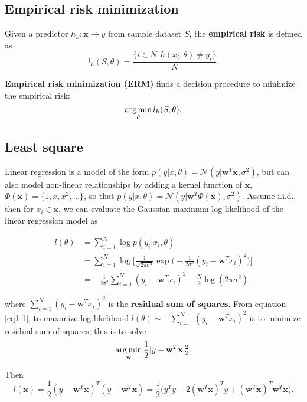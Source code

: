 \documentclass[../main.tex]{subfiles}
\begin{document}
\setlength{\parindent}{0pt}
\subsection{Empirical risk minimization}
Given a predictor $h_S:\textbf{x}\to y$ from sample dataset $S$, the \textbf{empirical risk} is defined as $$l_h(S, \theta)=\frac{\{i\in N: h(x_i, \theta)\neq y_i\}}{N}.$$

\textbf{Empirical risk minimization (ERM)} finds a decision procedure to minimize the empirical risk: $$\operatorname*{arg\,min}_{\theta}l_h(S, \theta).$$

\subsection{Least square}
Linear regression is a model of the form $p(y|x, \theta)=\mathcal N(y|\textbf{w}^T\textbf{x}, \sigma^2)$, but can also model non-linear relationships by adding a kernel function of $\textbf{x}$, $\Phi (\textbf{x})=\{1, x, x^2, ...\}$, so that $p(y|x, \theta)=\mathcal N(y|\textbf{w}^T\Phi (\textbf{x}), \sigma^2)$. Assume i.i.d., then for $x_i\in \textbf{x}$, we can evaluate the Gaussian maximum log likelihood of the linear regression model as

\begin{equation} \label{eq1-1}
\begin{split}
l(\theta) & = \sum_{i=1}^{N}\log p(y_i|x_i, \theta) \\
 & = \sum_{i=1}^N\log \bigg[ \frac{1}{\sqrt{2\pi\sigma^2}}\exp \big( -\frac{1}{2\sigma^2}(y_i-\textbf{w}^Tx_i)^2\big)\bigg] \\
 & = -\frac{1}{2\sigma^2}\sum_{i=1}^N(y_i-\textbf{w}^Tx_i)^2-\frac{N}{2}\log(2\pi\sigma^2),
\end{split}
\end{equation}

where $\sum_{i=1}^N(y_i-\textbf{w}^Tx_i)^2$ is the \textbf{residual sum of squares}.
From equation \ref{eq1-1}, to maximize log likelihood $l(\theta)\sim-\sum_{i=1}^N(y_i-\textbf{w}^Tx_i)^2$ is to minimize residual sum of squares; this is to solve
$$\operatorname*{arg\,min}_{\textbf{w}}\frac{1}{2}|y-\textbf{w}^T\textbf{x}|^2_2.$$ 

Then $$l(\textbf{x})=\frac{1}{2}(y-\textbf{w}^T\textbf{x})^T(y-\textbf{w}^T\textbf{x})=\frac{1}{2}\big(y^Ty-2(\textbf{w}^T\textbf{x})^Ty+(\textbf{w}^T\textbf{x})^T\textbf{w}^T\textbf{x}\big).$$
\end{document}
